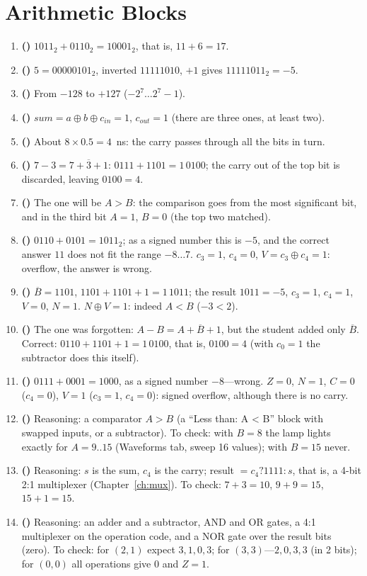 \section*{Arithmetic Blocks}
\begin{enumerate}
  \item \textbf{()} $1011_2+0110_2=10001_2$, that is, $11+6=17$.
  \item \textbf{()} $5=00000101_2$, inverted $11111010$, $+1$ gives $11111011_2=-5$.
  \item \textbf{()} From $-128$ to $+127$ ($-2^7\ldots 2^7-1$).
  \item \textbf{()} $sum=a\oplus b\oplus c_{in}=1$, $c_{out}=1$ (there are three ones, at least two).
  \item \textbf{()} About $8\times 0.5=4$~ns: the carry passes through all the bits in turn.
  \item \textbf{()} $7-3=7+\overline{3}+1$: $0111+1101=1\,0100$; the carry out of the top bit is discarded, leaving $0100=4$.
  \item \textbf{()} The one will be $A>B$: the comparison goes from the most significant bit, and in the third bit $A=1$, $B=0$ (the top two matched).
  \item \textbf{()} $0110+0101=1011_2$; as a signed number this is $-5$, and the correct answer $11$ does not fit the range $-8\ldots 7$. $c_3=1$, $c_4=0$, $V=c_3\oplus c_4=1$: overflow, the answer is wrong.
  \item \textbf{()} $\overline{B}=1101$, $1101+1101+1=1\,1011$; the result $1011=-5$, $c_3=1$, $c_4=1$, $V=0$, $N=1$. $N\oplus V=1$: indeed $A<B$ ($-3<2$).
  \item \textbf{()} The one was forgotten: $A-B=A+\overline{B}+1$, but the student added only $\overline{B}$. Correct: $0110+1101+1=1\,0100$, that is, $0100=4$ (with $c_0=1$ the subtractor does this itself).
  \item \textbf{()} $0111+0001=1000$, as a signed number $-8$---wrong. $Z=0$, $N=1$, $C=0$ ($c_4=0$), $V=1$ ($c_3=1$, $c_4=0$): signed overflow, although there is no carry.
  \item \textbf{()} Reasoning: a comparator $A>B$ (a ``Less than: A < B'' block with swapped inputs, or a subtractor). To check: with $B=8$ the lamp lights exactly for $A=9..15$ (Waveforms tab, sweep 16 values); with $B=15$ never.
  \item \textbf{()} Reasoning: $s$ is the sum, $c_4$ is the carry; result $= c_4 ? 1111 : s$, that is, a 4-bit 2:1 multiplexer (Chapter~\ref{ch:mux}). To check: $7+3=10$, $9+9=15$, $15+1=15$.
  \item \textbf{()} Reasoning: an adder and a subtractor, AND and OR gates, a 4:1 multiplexer on the operation code, and a NOR gate over the result bits (zero). To check: for $(2,1)$ expect $3,1,0,3$; for $(3,3)$---$2,0,3,3$ (in 2 bits); for $(0,0)$ all operations give 0 and $Z=1$.
\end{enumerate}

